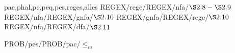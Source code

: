 pac,phal,pe,peq,pes,reges,alles
REGEX/rege/REGEX/nfa/$\S2.8-\S2.9$
REGEX/nfa/REGEX/gnfa/$\S2.10$
REGEX/gnfa/REGEX/rege/$\S2.10$
REGEX/nfa/REGEX/dfa/$\S2.11$

PROB/pes/PROB/pac/$\leq_m$